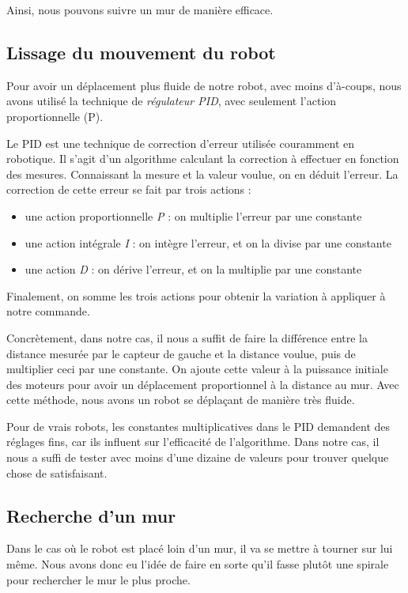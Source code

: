 \documentclass{scrartcl}
\begin{document}
Ainsi, nous pouvons suivre un mur de manière efficace.

\subsection{Lissage du mouvement du robot}

Pour avoir un déplacement plus fluide de notre robot, avec moins
d'à-coups, nous avons utilisé la technique de \emph{régulateur PID},
avec seulement l'action proportionnelle (P).

Le PID est une technique de correction d'erreur utilisée couramment en
robotique. Il s'agit d'un algorithme calculant la correction à effectuer
en fonction des mesures. Connaissant la mesure et la valeur voulue,
on en déduit l'erreur. La correction de cette erreur se fait par trois
actions :

\begin{itemize}
    \item une action proportionnelle \textit{P} : on multiplie l'erreur par une constante
    \item une action intégrale \textit{I} : on intègre l'erreur, et on la divise par une constante
    \item une action \textit{D} : on dérive l'erreur, et on la multiplie par une constante
\end{itemize}

Finalement, on somme les trois actions pour obtenir la variation à appliquer à notre
commande.

Concrètement, dans notre cas, il nous a suffit de faire la différence entre
la distance mesurée par le capteur de gauche et la distance voulue, puis
de multiplier ceci par une constante. On ajoute cette valeur à la puissance initiale
des moteurs pour avoir un déplacement proportionnel à la distance au mur.
Avec cette méthode, nous avons un robot se déplaçant de manière très fluide.

Pour de vrais robots, les constantes multiplicatives dans le PID demandent des réglages
fins, car ils influent sur l'efficacité de l'algorithme. Dans notre cas, il nous
a suffi de tester avec moins d'une dizaine de valeurs pour trouver quelque chose
de satisfaisant.

\subsection{Recherche d'un mur}

Dans le cas où le robot est placé loin d'un mur, il va se mettre à tourner sur lui même.
Nous avons donc eu l'idée de faire en sorte qu'il fasse plutôt une spirale pour
rechercher le mur le plus proche.
\end{document}
